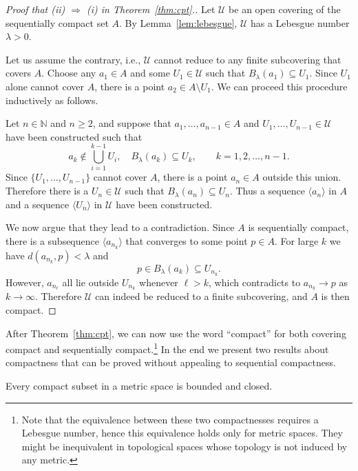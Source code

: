 \begin{proof}[Proof that (ii) $\Rightarrow$ (i) in Theorem~\ref{thm:cpt}.]
  Let $\mathcal{U}$ be an open covering of the sequentially compact set $A$.
  By Lemma~\ref{lem:lebesgue}, $\mathcal{U}$ has a Lebesgue number $\lambda > 0$.

  Let us assume the contrary, i.e., $\mathcal{U}$ cannot reduce to any finite subcovering that covers $A$.
  Choose any $a_1 \in A$ and some $U_1 \in \mathcal{U}$ such that $B_\lambda(a_1) \subseteq U_1$.
  Since $U_1$ alone cannot cover $A$, there is a point $a_2 \in A \setminus U_1$.
  We can proceed this procedure inductively as follows.

  Let $n \in \mathbb{N}$ and $n \geqslant 2$, and suppose that $a_1, \dots, a_{n-1} \in A$ and $U_1, \dots, U_{n-1} \in \mathcal{U}$ have been constructed such that
  \[
    a_k \notin \bigcup_{i=1}^{k-1} U_i, \quad
    B_\lambda(a_k) \subseteq U_k, \qquad k = 1, 2, \dots, n-1.
  \]
  Since $\{ U_1, \dots, U_{n-1} \}$ cannot cover $A$, there is a point $a_n \in A$ outside this union.
  Therefore there is a $U_n \in \mathcal{U}$ such that $B_\lambda(a_n) \subseteq U_n$.
  Thus a sequence $\langle a_n \rangle$ in $A$ and a sequence $\langle U_n \rangle$ in $\mathcal{U}$ have been constructed.

  We now argue that they lead to a contradiction.
  Since $A$ is sequentially compact, there is a subsequence $\langle a_{n_k} \rangle$ that converges to some point $p \in A$.
  For large $k$ we have $d(a_{n_k},p) < \lambda$ and
  \[
    p \in B_\lambda(a_k) \subseteq U_{n_k}.
  \]
  However, $a_{n_\ell}$ all lie outside $U_{n_k}$ whenever $\ell > k$, which contradicts to $a_{n_k} \to p$ as $k \to \infty$.
  Therefore $\mathcal{U}$ can indeed be reduced to a finite subcovering, and $A$ is then compact.
\end{proof}

After Theorem~\ref{thm:cpt}, we can now use the word ``compact'' for both covering compact and sequentially compact.\footnote{Note that the equivalence between these two compactnesses requires a Lebesgue number, hence this equivalence holds only for metric spaces.
They might be inequivalent in topological spaces whose topology is not induced by any metric.}
In the end we present two results about compactness that can be proved without appealing to sequential compactness.

\begin{thm}
  Every compact subset in a metric space is bounded and closed.
\end{thm}

